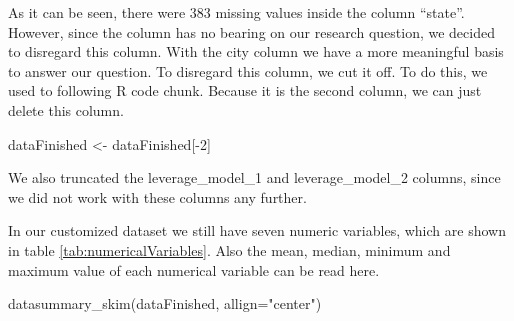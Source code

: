 \documentclass[
  11pt,
  a4paper,
  twoside]{scrbook}
\newenvironment{Shaded}{\begin{snugshade}}{\end{snugshade}}
\newcommand{\AttributeTok}[1]{\textcolor[rgb]{0.77,0.63,0.00}{#1}}
\newcommand{\DecValTok}[1]{\textcolor[rgb]{0.00,0.00,0.81}{#1}}
\newcommand{\FunctionTok}[1]{\textcolor[rgb]{0.00,0.00,0.00}{#1}}
\newcommand{\NormalTok}[1]{#1}
\newcommand{\OtherTok}[1]{\textcolor[rgb]{0.56,0.35,0.01}{#1}}
\newcommand{\SpecialCharTok}[1]{\textcolor[rgb]{0.00,0.00,0.00}{#1}}
\newcommand{\StringTok}[1]{\textcolor[rgb]{0.31,0.60,0.02}{#1}}
\begin{document}
As it can be seen, there were \(383\) missing values inside the column ``state''.
However, since the column has no bearing on our research question, we decided to disregard this column. With the city column we have a more meaningful basis to answer our question.
To disregard this column, we cut it off. To do this, we used to following R code chunk. Because it is the second column, we can just delete this column.

\linespread{1}

\begin{Shaded}
\begin{Highlighting}[]
\NormalTok{dataFinished }\OtherTok{\textless{}{-}}\NormalTok{ dataFinished[}\SpecialCharTok{{-}}\DecValTok{2}\NormalTok{]}
\end{Highlighting}
\end{Shaded}

\linespread{1}

We also truncated the leverage\_model\_1 and leverage\_model\_2 columns, since we did not work with these columns any further.

In our customized dataset we still have seven numeric variables, which are shown in table \ref{tab:numericalVariables}. Also the mean, median, minimum and maximum value of each numerical variable can be read here.

\linespread{1}

\begin{Shaded}
\begin{Highlighting}[]
\FunctionTok{datasummary\_skim}\NormalTok{(dataFinished, }\AttributeTok{allign=}\StringTok{"center"}\NormalTok{)}
\end{Highlighting}
\end{Shaded}

\linespread{1}
\end{document}
